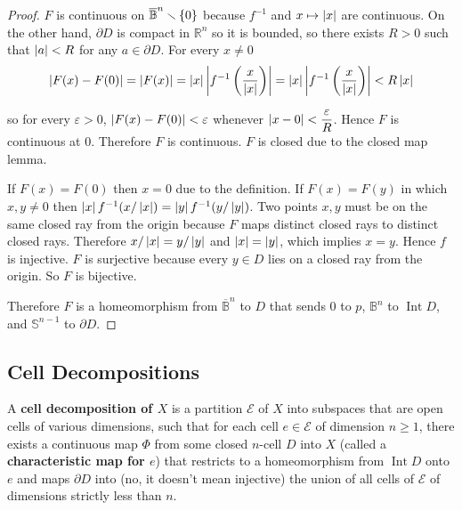 \begin{proof}
	\( F \) is continuous on \( \overline{\mathbb{B}}^{n}\smallsetminus\left\{{0}\right\} \) because \( f^{-1} \) and \( x\mapsto \left\vert{x}\right\vert \) are continuous. On the other hand, \( \partial D \) is compact in \( \mathbb{R}^{n} \) so it is bounded, so there exists \( R > 0 \) such that \( \left\vert{a}\right\vert < R \) for any \( a \in \partial D \). For every \( x \ne 0 \)
	\begin{align*}
		\left\vert{F(x) - F(0)}\right\vert = \left\vert{F(x)}\right\vert = \left\vert{x}\right\vert\left\vert{f^{-1}\left(\frac{x}{\left\vert{x}\right\vert}\right)}\right\vert = \left\vert{x}\right\vert\left\vert{f^{-1}\left(\frac{x}{\left\vert{x}\right\vert}\right)}\right\vert < R\left\vert{x}\right\vert
	\end{align*}

	so for every \( \varepsilon > 0 \), \( \left\vert{F(x) - F(0)}\right\vert < \varepsilon \) whenever \( \left\vert{x - 0}\right\vert < \dfrac{\varepsilon}{R} \). Hence \( F \) is continuous at \( 0 \). Therefore \( F \) is continuous. \( F \) is closed due to the closed map lemma.

	If \( F(x) = F(0) \) then \( x = 0 \) due to the definition. If \( F(x) = F(y) \) in which \( x, y\ne 0 \) then \( \left\vert{x}\right\vert f^{-1}(x/\left\vert{x}\right\vert) = \left\vert{y}\right\vert f^{-1}(y/\left\vert{y}\right\vert) \). Two points \( x, y \) must be on the same closed ray from the origin because \( F \) maps distinct closed rays to distinct closed rays. Therefore \( x/\left\vert{x}\right\vert = y/\left\vert{y}\right\vert \) and \( \left\vert{x}\right\vert = \left\vert{y}\right\vert \), which implies \( x = y \). Hence \( f \) is injective. \( F \) is surjective because every \( y\in D \) lies on a closed ray from the origin. So \( F \) is bijective.

	Therefore \( F \) is a homeomorphism from \( \overline{\mathbb{B}}^{n} \) to \( D \) that sends \( 0 \) to \( p \), \( \mathbb{B}^{n} \) to \( \operatorname{Int} D \), and \( \mathbb{S}^{n-1} \) to \( \partial D \).
\end{proof}

\subsection*{Cell Decompositions}

A \textbf{cell decomposition of \( X \)} is a partition \( \mathscr{E} \) of \( X \) into subspaces that are open cells of various dimensions, such that for each cell \( e \in \mathscr{E} \) of dimension \( n\geq 1 \), there exists a continuous map \( \Phi \) from some closed \( n \)-cell \( D \) into \( X \) (called a \textbf{characteristic map for \( e \)}) that restricts to a homeomorphism from \( \operatorname{Int} D \) onto \( e \) and maps \( \partial D \) into (no, it doesn't mean injective) the union of all cells of \( \mathscr{E} \) of dimensions strictly less than \( n \).


